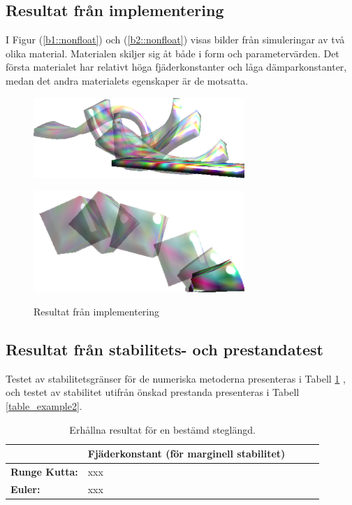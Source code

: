 \documentclass[a4paper,12pt,oneside,final,swedish]{extarticle}
\begin{document}
\subsection{Resultat från implementering}
I Figur (\ref{b1::nonfloat}) och (\ref{b2::nonfloat}) visas bilder från simuleringar av två olika material. Materialen skiljer sig åt både i form och parametervärden. Det första materialet har relativt höga fjäderkonstanter och låga dämparkonstanter, medan det andra materialets egenskaper är de motsatta.
\begin{figure} [h] 
 \begin{minipage}[b]{.5\linewidth}
    \centering
    \includegraphics[width=8cm]{Bilder/Anim1.png} 
    \subcaption{}\label{b1::nonfloat}
  \end{minipage}
 \begin{minipage}[b]{.5\linewidth}
    \centering
    \includegraphics[width=8cm]{Bilder/Anim2.png} 
    \subcaption{}\label{b2::nonfloat}
  \end{minipage}
  \caption{Resultat från implementering}
  \label{res_imp::nonfloat}
\end{figure}


\subsection{Resultat från stabilitets- och prestandatest}
Testet av stabilitetsgränser för de numeriska metoderna presenteras i Tabell \ref{table_example1} , och testet av stabilitet utifrån önskad prestanda presenteras i Tabell \ref{table_example2}.
\begin{table}[htbp]
    \caption{Erhållna resultat för en bestämd steglängd.}
    \label{table_example1}
    \begin{tabular*}{\hsize}{lllll}
      \hline %
       & \bfseries Fjäderkonstant (för marginell stabilitet)\\
      \hline
      \bfseries Runge Kutta: & xxx\\
      \bfseries Euler: & xxx\\
      \hline
    \end{tabular*}
\end{table}
\end{document}
